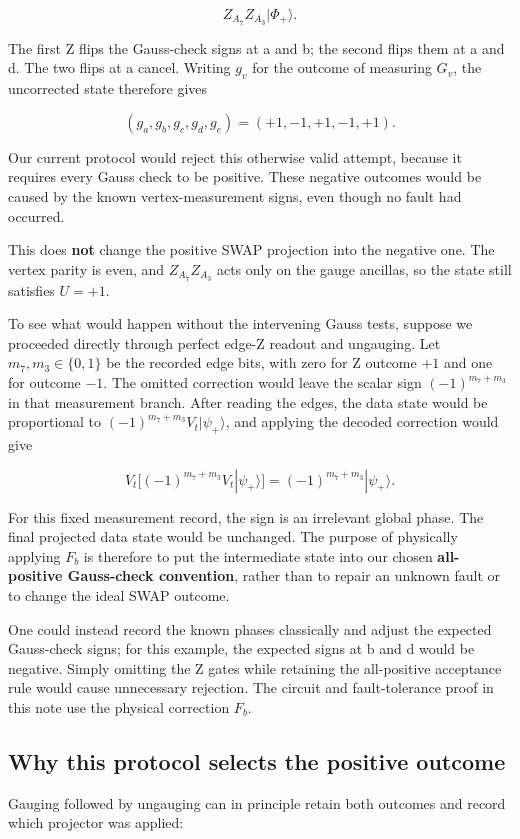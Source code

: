 \documentclass[11pt]{article}
\begin{document}
\[
Z_{A_7}Z_{A_3}|\Phi_+\rangle.
\]

The first Z flips the Gauss-check signs at a and b; the second flips them at a and d. The two flips at a cancel. Writing \(g_v\) for the outcome of measuring \(G_v\), the uncorrected state therefore gives

\[
(g_a,g_b,g_c,g_d,g_e)=(+1,-1,+1,-1,+1).
\]

Our current protocol would reject this otherwise valid attempt, because it requires every Gauss check to be positive. These negative outcomes would be caused by the known vertex-measurement signs, even though no fault had occurred.

This does \textbf{not} change the positive SWAP projection into the negative one. The vertex parity is even, and \(Z_{A_7}Z_{A_3}\) acts only on the gauge ancillas, so the state still satisfies \(U=+1\).

To see what would happen without the intervening Gauss tests, suppose we proceeded directly through perfect edge-Z readout and ungauging. Let \(m_7,m_3\in\{0,1\}\) be the recorded edge bits, with zero for Z outcome \(+1\) and one for outcome \(-1\). The omitted correction would leave the scalar sign \((-1)^{m_7+m_3}\) in that measurement branch. After reading the edges, the data state would be proportional to \((-1)^{m_7+m_3}V_t|\psi_+\rangle\), and applying the decoded correction would give

\[
V_t\bigl[(-1)^{m_7+m_3}V_t|\psi_+\rangle\bigr]
=(-1)^{m_7+m_3}|\psi_+\rangle.
\]

For this fixed measurement record, the sign is an irrelevant global phase. The final projected data state would be unchanged. The purpose of physically applying \(F_b\) is therefore to put the intermediate state into our chosen \textbf{all-positive Gauss-check convention}, rather than to repair an unknown fault or to change the ideal SWAP outcome.

One could instead record the known phases classically and adjust the expected Gauss-check signs; for this example, the expected signs at b and d would be negative. Simply omitting the Z gates while retaining the all-positive acceptance rule would cause unnecessary rejection. The circuit and fault-tolerance proof in this note use the physical correction \(F_b\).

\subsection{Why this protocol selects the positive outcome}
Gauging followed by ungauging can in principle retain both outcomes and record which projector was applied:
\end{document}
